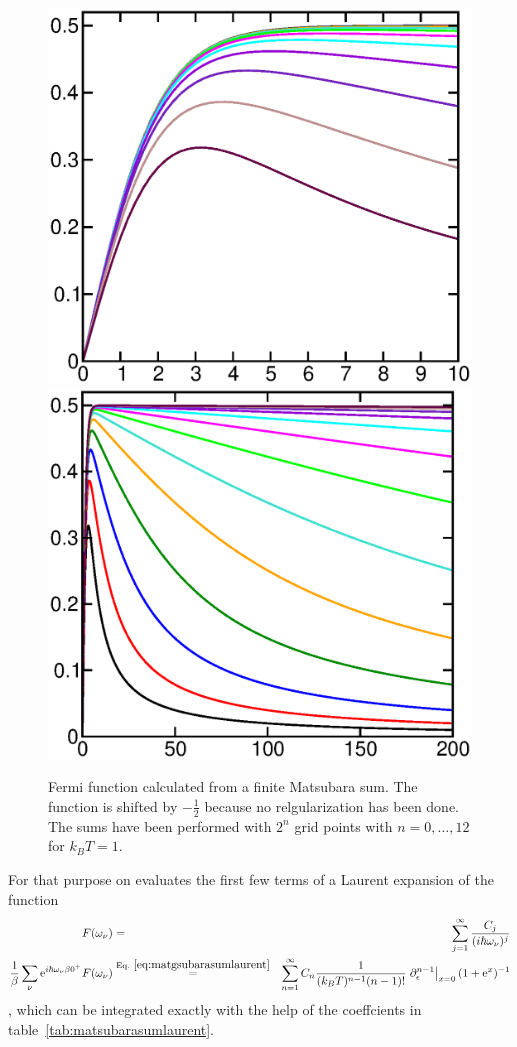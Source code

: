 \documentclass[11pt,a4paper]{report}
\begin{document}
\begin{figure}[h!]
\begin{center}
\includegraphics[width=0.4\linewidth,clip=true]
{Figs/Xmgrace/FiniteMatsubara/gsumlow.eps}
\includegraphics[width=0.4\linewidth,clip=true]
{Figs/Xmgrace/FiniteMatsubara/gsumhigh.eps}
\end{center}
\caption{\label{fig:finfitematsubara} Fermi function calculated from a
  finite Matsubara sum. The function is shifted by $-\frac{1}{2}$
  because no relgularization has been done. The sums have been
  performed with $2^n$ grid points with $n=0,\ldots,12$ for $k_BT=1.$}
\end{figure}

For that purpose on evaluates the first few terms of a Laurent
expansion of the function
\begin{eqnarray}
F(\omega_\nu)&=&\sum_{j=1}^\infty \frac{C_j}{(i\hbar\omega_\nu)^j} 
\nonumber\\
\frac{1}{\beta}\sum_\nu\e{i\hbar\omega_\nu\beta0^+} F(\omega_\nu)
&\eqrel{eq:matgsubarasumlaurent}{=}&
\sum_{n=1}^\infty C_n
\frac{1}{(k_BT)^{n-1}(n-1)!}
\left.\partial_\epsilon^{n-1}\right|_{x=0}(1+\e{x})^{-1}
\end{eqnarray}
, which can be integrated exactly with the help of the coeffcients in
table~\ref{tab:matsubarasumlaurent}.
\end{document}
